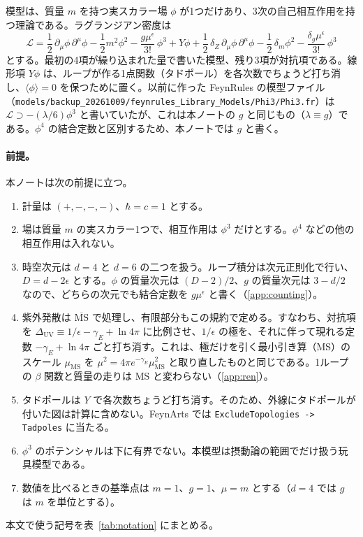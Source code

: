 \documentclass[a4paper,10pt]{ltjsarticle}
\begin{document}
模型は、質量 $m$ を持つ実スカラー場 $\phi$ が1つだけあり、3次の自己相互作用を持つ理論である。ラグランジアン密度は
\begin{equation}
\mathcal{L}=\frac12\,\partial_\mu\phi\,\partial^\mu\phi-\frac12 m^2\phi^2-\frac{g\mu^{\epsilon}}{3!}\,\phi^3+Y\phi
+\frac12\,\delta_Z\,\partial_\mu\phi\,\partial^\mu\phi-\frac12\,\delta_m\phi^2-\frac{\delta_g\mu^{\epsilon}}{3!}\,\phi^3
\label{eq:L}
\end{equation}
とする。最初の4項が繰り込まれた量で書いた模型、残り3項が対抗項である。線形項 $Y\phi$ は、ループが作る1点関数（タドポール）を各次数でちょうど打ち消し、$\langle\phi\rangle=0$ を保つために置く。以前に作った FeynRules の模型ファイル（\nolinkurl{models/backup_20261009/feynrules_Library_Models/Phi3/Phi3.fr}）は $\mathcal{L}\supset-(\lambda/6)\phi^3$ と書いていたが、これは本ノートの $g$ と同じもの（$\lambda\equiv g$）である。$\phi^4$ の結合定数と区別するため、本ノートでは $g$ と書く。

\paragraph{前提。}本ノートは次の前提に立つ。
\begin{enumerate}
\item 計量は $(+,-,-,-)$、$\hbar=c=1$ とする。
\item 場は質量 $m$ の実スカラー1つで、相互作用は $\phi^3$ だけとする。$\phi^4$ などの他の相互作用は入れない。
\item 時空次元は $d=4$ と $d=6$ の二つを扱う。ループ積分は次元正則化で行い、$D=d-2\epsilon$ とする。$\phi$ の質量次元は $(D-2)/2$、$g$ の質量次元は $3-d/2$ なので、どちらの次元でも結合定数を $g\mu^{\epsilon}$ と書く（\ref{app:counting}）。
\item 紫外発散は $\overline{\mathrm{MS}}$ で処理し、有限部分もこの規約で定める。すなわち、対抗項を $\Delta_{\mathrm{UV}}\equiv1/\epsilon-\gamma_E+\ln4\pi$ に比例させ、$1/\epsilon$ の極を、それに伴って現れる定数 $-\gamma_E+\ln4\pi$ ごと打ち消す。これは、極だけを引く最小引き算（MS）のスケール $\mu_{\mathrm{MS}}$ を $\mu^2=4\pi e^{-\gamma_E}\mu_{\mathrm{MS}}^2$ と取り直したものと同じである。1ループの $\beta$ 関数と質量の走りは MS と変わらない（\ref{app:ren}）。
\item タドポールは $Y$ で各次数ちょうど打ち消す。そのため、外線にタドポールが付いた図は計算に含めない。FeynArts では \texttt{ExcludeTopologies -> Tadpoles} に当たる。
\item $\phi^3$ のポテンシャルは下に有界でない。本模型は摂動論の範囲でだけ扱う玩具模型である。
\item 数値を比べるときの基準点は $m=1$、$g=1$、$\mu=m$ とする（$d=4$ では $g$ は $m$ を単位とする）。
\end{enumerate}
本文で使う記号を表~\ref{tab:notation} にまとめる。
\end{document}

